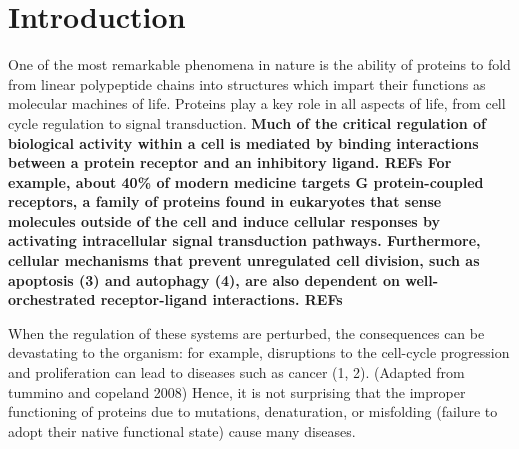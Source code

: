 \chapter{Introduction}



One of the most remarkable phenomena in nature is the ability of proteins to fold from linear polypeptide chains into structures which impart their functions as molecular machines of life. Proteins play a key role in all aspects of life, from cell cycle regulation to signal transduction. 
\textbf{Much of the critical regulation of biological activity within a cell is mediated by binding interactions between a protein receptor and an inhibitory ligand. REFs For example,  about 40\% of modern medicine targets G protein-coupled receptors, a family of proteins found in eukaryotes that sense molecules outside of the cell and induce cellular responses by activating intracellular signal transduction pathways.
Furthermore, cellular mechanisms that prevent unregulated cell division, such as apoptosis (3) and autophagy (4), are also dependent on well-orchestrated receptor-ligand interactions. REFs}

When the regulation of these systems are perturbed, the consequences can be devastating to the organism: for example, disruptions to the cell-cycle progression and proliferation can lead to diseases such as cancer (1, 2). (Adapted from tummino and copeland 2008)
Hence, it is not surprising that the improper functioning of proteins due to mutations, denaturation, or misfolding (failure to adopt their native functional state) cause many diseases.

